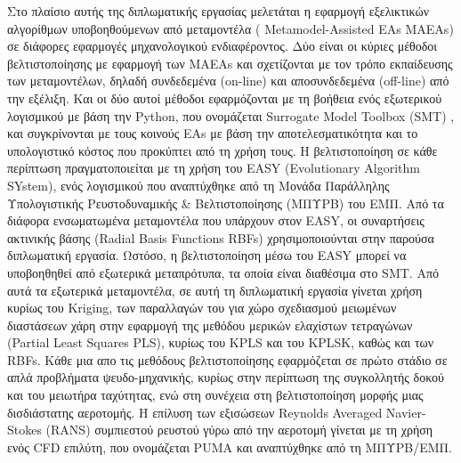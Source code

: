 \documentclass[twoside, 12pt,notitlepage]{report}
\begin{document}
Στο πλαίσιο αυτής της διπλωματικής εργασίας μελετάται η 
εφαρμογή εξελικτικών αλγορίθμων υποβοηθούμενων από μεταμοντέλα 
( Metamodel-Assisted EAs MAEAs) σε διάφορες εφαρμογές 
μηχανολογικού ενδιαφέροντος. Δύο είναι οι κύριες μέθοδοι 
βελτιστοποίησης με εφαρμογή των MAEAs και σχετίζονται με τον τρόπο 
εκπαίδευσης των μεταμοντέλων, δηλαδή συνδεδεμένα (on-line) και 
αποσυνδεδεμένα (off-line) από την εξέλιξη. Και οι δύο αυτοί μέθοδοι 
εφαρμόζονται με τη βοήθεια ενός εξωτερικού λογισμικού με βάση την 
Python, που ονομάζεται Surrogate Model Toolbox (SMT)
\cite{preprint_SMT_app}, και συγκρίνονται με τους κοινούς ΕΑs με 
βάση την αποτελεσματικότητα και το υπολογιστικό κόστος που 
προκύπτει από τη χρήση τους. Η βελτιστοποίηση σε κάθε περίπτωση 
πραγματοποιείται με τη χρήση του EASY\cite{EASY_app} (Evolutionary 
Algorithm SYstem), ενός λογισμικού που αναπτύχθηκε από τη Μονάδα 
Παράλληλης Υπολογιστικής Ρευστοδυναμικής \& Βελτιστοποίησης (ΜΠΥΡΒ) 
του ΕΜΠ. Από τα διάφορα ενσωματωμένα μεταμοντέλα που υπάρχουν στον 
EASY, οι συναρτήσεις ακτινικής βάσης \cite{RBF_app} (Radial Basis 
Functions RBFs) χρησιμοποιούνται στην παρούσα διπλωματική εργασία. 
Ωστόσο, η βελτιστοποίηση μέσω του EASY μπορεί να υποβοηθηθεί από 
εξωτερικά μεταπρότυπα, τα οποία είναι διαθέσιμα στο SMT. Από αυτά 
τα εξωτερικά μεταμοντέλα, σε αυτή τη διπλωματική εργασία γίνεται 
χρήση κυρίως του Kriging\cite{Kriging_app}, των παραλλαγών του για 
χώρο σχεδιασμού μειωμένων διαστάσεων χάρη στην εφαρμογή της
μεθόδου μερικών ελαχίστων τετραγώνων (Partial Least Squares PLS), 
κυρίως του KPLS\cite{KPLS_app} και του KPLSK\cite{KPLSK_app}, 
καθώς και των RBFs. Κάθε μια απο τις μεθόδους βελτιστοποίησης 
εφαρμόζεται σε πρώτο στάδιο σε απλά προβλήματα ψευδο-μηχανικής, 
κυρίως στην περίπτωση της συγκολλητής δοκού και του μειωτήρα 
ταχύτητας, ενώ στη συνέχεια στη βελτιστοποίηση μορφής μιας 
δισδιάστατης αεροτομής. Η επίλυση των εξισώσεων Reynolds 
Averaged Navier-Stokes (RANS) συμπιεστού ρευστού γύρω από την 
αεροτομή γίνεται με τη χρήση ενός CFD επιλύτη, που ονομάζεται 
PUMA\cite{PUMA_app} και αναπτύχθηκε από τη ΜΠΥΡΒ/ΕΜΠ.


\newpage
\end{document}
